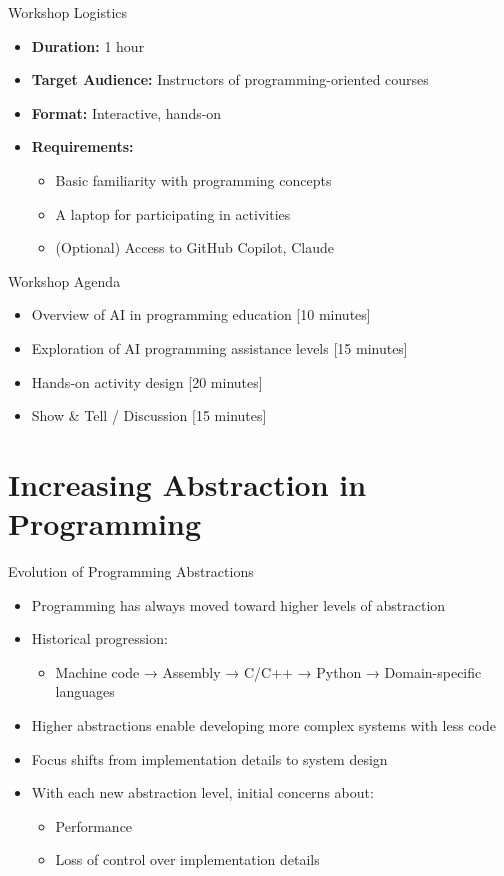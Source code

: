 \documentclass[xcolor={dvipsnames}, aspectratio=169]{beamer}
\begin{document}
\begin{frame}{Workshop Logistics}
  \begin{itemize}
    \item \textbf{Duration:} 1 hour
    \item \textbf{Target Audience:} Instructors of programming-oriented courses
    \item \textbf{Format:} Interactive, hands-on
    \item \textbf{Requirements:} 
      \begin{itemize}
        \item Basic familiarity with programming concepts
        \item A laptop for participating in activities
        \item (Optional) Access to GitHub Copilot, Claude
      \end{itemize}
  \end{itemize}
\end{frame}

\begin{frame}{Workshop Agenda}
  \begin{itemize}
    \item Overview of AI in programming education [10 minutes]
    \item Exploration of AI programming assistance levels [15 minutes]
    \item Hands-on activity design [20 minutes]
    \item Show \& Tell / Discussion [15 minutes]
  \end{itemize}
\end{frame}

\section{Increasing Abstraction in Programming}

\begin{frame}{Evolution of Programming Abstractions}
  \begin{itemize}
    \item Programming has always moved toward higher levels of abstraction
    \item Historical progression:
      \begin{itemize}
        \item Machine code → Assembly → C/C++ → Python → Domain-specific languages
      \end{itemize}
    \item Higher abstractions enable developing more complex systems with less code
    \item Focus shifts from implementation details to system design
    \item With each new abstraction level, initial concerns about:
      \begin{itemize}
        \item Performance
        \item Loss of control over implementation details
      \end{itemize}
  \end{itemize}
\end{frame}
\end{document}
